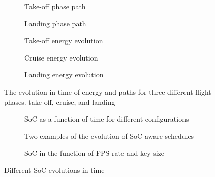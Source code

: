   \begin{figure}[p]
    \centering
    \selectfont
    \footnotesize
    \begin{subfigure}[c]{0.475\textwidth}
      \centering
      
      \caption{Take-off phase path}
      \label{fig:takeoff-path}
      \vspace{3ex}
    \end{subfigure}
    \begin{subfigure}[c]{0.475\textwidth}
      \centering
      
      \vspace*{3ex}
      \caption{Landing phase path}
      \label{fig:landing-path}
      \vspace{3ex}
    \end{subfigure}
    \quad
    \begin{subfigure}[t]{0.34\textwidth}
      \centering
      
      \caption{Take-off energy evolution}
      \label{fig:takeoff-energy}
    \end{subfigure}
    \begin{subfigure}[t]{0.32\textwidth}
      \centering
      
      \caption{Cruise energy evolution}
      \label{fig:cruise-energy}
    \end{subfigure}
    \begin{subfigure}[t]{0.30\textwidth}
      \centering
      
      \caption{Landing energy evolution}
      \label{fig:landing-energy}
    \end{subfigure}
    \caption{The evolution in time of energy and paths for three different flight phases. take-off, cruise, and landing}
    \label{fig:path-energy}
  \end{figure}

  \begin{figure}[p]
    \centering
    \selectfont
    \footnotesize
    \begin{subfigure}[t]{0.31\textwidth}
      \centering
      
      \vspace*{-2.5ex}
      \caption{SoC as a function of time for different configurations}
      \label{fig:soc-configuration}
    \end{subfigure}
    \begin{subfigure}[t]{0.29\textwidth}
      \centering
      
      \caption{Two examples of the evolution of SoC-aware schedules}
      \label{fig:soc-schedule}
    \end{subfigure}
    \begin{subfigure}[t]{0.36\textwidth}
      \centering
      
      \vspace*{-2.6ex}
      \caption{SoC in the function of FPS rate and key-size}
      \label{fig:soc-plot}
    \end{subfigure}
    \caption{Different SoC evolutions in time}
    \label{fig:soc-evolution1}
  \end{figure}

